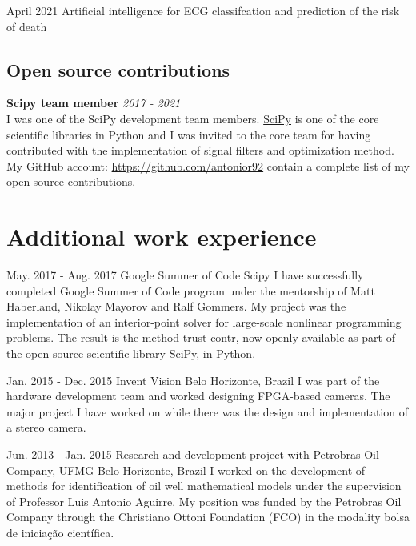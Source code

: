 \documentclass[10pt,letterpaper]{article} %
\begin{document}
    
    { April 2021 }
    { Artificial intelligence for ECG classifcation and prediction of the risk of death  }
    { }{}
    



\subsection*{Open source contributions}

{\bf Scipy team member} \hfill {\em 2017 - 2021} \\
I was one of the SciPy development team members.
\href{https://www.scipy.org}{SciPy} is one of the core scientific libraries in Python and I was invited to the core team
for having contributed with the implementation of signal filters
and optimization method.
My GitHub account: \href{https://github.com/antonior92}{https://github.com/antonior92}
contain a complete list of my open-source contributions.

\section*{Additional work experience} %


    { May. 2017 -   Aug. 2017 }
    { Google Summer of Code }
    { Scipy }
    { I have successfully completed Google Summer of Code program under the mentorship of Matt Haberland, Nikolay Mayorov and Ralf Gommers. My project was the implementation of an interior-point solver for large-scale nonlinear programming problems. The result is the method trust-contr, now openly available as part of the open source scientific library SciPy, in Python. }

    { Jan. 2015 -   Dec. 2015 }
    { Invent Vision }
    { Belo Horizonte, Brazil }
    { I was part of the hardware development team and worked designing FPGA-based cameras. The major project I have worked on while there was the design and implementation of a stereo camera. }

    { Jun. 2013 -   Jan. 2015 }
    { Research and development project with Petrobras Oil Company, UFMG }
    { Belo Horizonte, Brazil }
    { I worked on the development of methods for identification of oil well mathematical models under the supervision of Professor Luis Antonio Aguirre. My position was funded by the Petrobras Oil Company through the Christiano Ottoni Foundation (FCO) in the modality bolsa de iniciação científica. }
\end{document}
